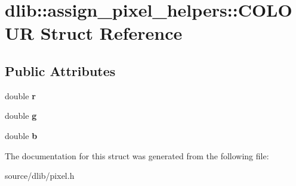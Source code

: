 \hypertarget{structdlib_1_1assign__pixel__helpers_1_1COLOUR}{
\section{dlib::assign\_\-pixel\_\-helpers::COLOUR Struct Reference}
\label{structdlib_1_1assign__pixel__helpers_1_1COLOUR}
}
\subsection*{Public Attributes}
\begin{DoxyCompactItemize}
\item 
\hypertarget{structdlib_1_1assign__pixel__helpers_1_1COLOUR_af2e26a1ed3dac0e6ae25684de1e2c408}{
double {\bfseries r}}
\label{structdlib_1_1assign__pixel__helpers_1_1COLOUR_af2e26a1ed3dac0e6ae25684de1e2c408}

\item 
\hypertarget{structdlib_1_1assign__pixel__helpers_1_1COLOUR_ab9df6f2551a9b3cae245c7cfb8ebb3e5}{
double {\bfseries g}}
\label{structdlib_1_1assign__pixel__helpers_1_1COLOUR_ab9df6f2551a9b3cae245c7cfb8ebb3e5}

\item 
\hypertarget{structdlib_1_1assign__pixel__helpers_1_1COLOUR_af289608c223577fef437a8d6a05e653b}{
double {\bfseries b}}
\label{structdlib_1_1assign__pixel__helpers_1_1COLOUR_af289608c223577fef437a8d6a05e653b}

\end{DoxyCompactItemize}


The documentation for this struct was generated from the following file:\begin{DoxyCompactItemize}
\item 
source/dlib/pixel.h\end{DoxyCompactItemize}
